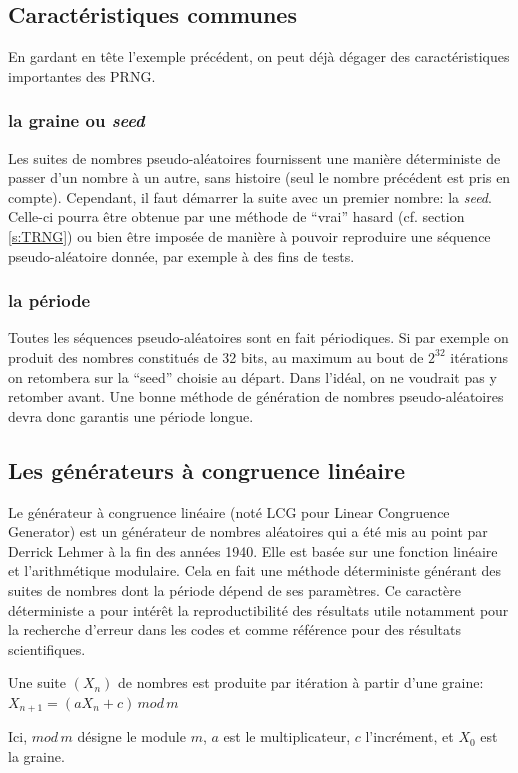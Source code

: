 \documentclass{scrartcl}
\begin{document}
\subsection{Caractéristiques communes}
En gardant en tête l'exemple précédent, on peut déjà dégager des
caractéristiques importantes des PRNG.
\subsubsection{la graine ou \textit{seed}}
Les suites de nombres pseudo-aléatoires fournissent une manière déterministe de
passer d'un nombre à un autre, sans histoire (seul le nombre précédent est pris
en compte). Cependant, il faut démarrer la suite avec un premier nombre: la
\textit{seed}. Celle-ci pourra être obtenue par une méthode de ``vrai'' hasard
(cf. section \ref{s:TRNG}) ou bien être imposée de manière à pouvoir reproduire
une séquence pseudo-aléatoire donnée, par exemple à des fins de tests.
\subsubsection{la période}
Toutes les séquences pseudo-aléatoires sont en fait périodiques. Si par exemple
on produit des nombres constitués de 32 bits, au maximum au bout de $2^{32}$
itérations on retombera sur la ``seed'' choisie au départ. Dans l'idéal, on ne
voudrait pas y retomber avant. Une bonne méthode de génération de nombres
pseudo-aléatoires devra donc garantis une période longue.

\subsection{Les générateurs à congruence linéaire}
Le générateur à congruence linéaire (noté LCG pour Linear Congruence Generator)
est un générateur de nombres aléatoires qui a été mis au point par Derrick
Lehmer à la fin des années 1940. Elle est basée sur une fonction linéaire et
l'arithmétique modulaire. Cela en fait une méthode déterministe générant des
suites de nombres dont la période dépend de ses paramètres.  Ce caractère
déterministe a pour intérêt la reproductibilité des résultats utile notamment
pour la recherche d'erreur dans les codes et comme référence pour des résultats
scientifiques.\par
Une suite $(X_n)$ de nombres est produite par itération à partir d'une
graine:\linebreak
$X_{n+1} = (a X_n +c)\, mod\, m$\par
Ici, $mod \, m$ désigne le module $m$, $a$ est le multiplicateur, $c$
l'incrément,
et $X_0$ est la graine. \par
\end{document}
